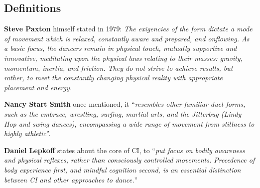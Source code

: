 \subsection{Definitions}\label{subsec:definitions}

\textbf{Steve Paxton} himself stated in 1979: \textit{The exigencies of the form dictate a mode of movement which is relaxed, constantly aware and prepared, and onflowing. As a basic focus, the dancers remain in physical touch, mutually supportive and innovative, meditating upon the physical laws relating to their masses: gravity, momentum, inertia, and friction. They do not strive to achieve results, but rather, to meet the constantly changing physical reality with appropriate placement and energy.}

\textbf{Nancy Start Smith} once mentioned, it ``\textit{resembles other familiar duet forms, such as the embrace, wrestling, surfing, martial arts, and the Jitterbug (Lindy Hop and swing dances), encompassing a wide range of movement from stillness to highly athletic}''.

\textbf{Daniel Lepkoff} states about the core of CI, to ``\textit{put focus on bodily awareness and physical reflexes, rather than consciously controlled movements. Precedence of body experience first, and mindful cognition second, is an essential distinction between CI and other approaches to dance.}''
